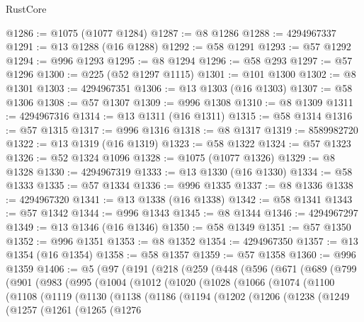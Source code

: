 \begin{lexlean}{RustCore}
\begin{coremodule}
@1286 := @1075 (@1077 @1284)
@1287 := @8 @1286
@1288 := 4294967337
@1291 := @13 @1288 (@16 @1288)
@1292 := @58 @1291
@1293 := @57 @1292
@1294 := @996 @1293
@1295 := @8 @1294
@1296 := @58 @293
@1297 := @57 @1296
@1300 := @225 (@52 @1297 @1115)
@1301 := @101 @1300
@1302 := @8 @1301
@1303 := 4294967351
@1306 := @13 @1303 (@16 @1303)
@1307 := @58 @1306
@1308 := @57 @1307
@1309 := @996 @1308
@1310 := @8 @1309
@1311 := 4294967316
@1314 := @13 @1311 (@16 @1311)
@1315 := @58 @1314
@1316 := @57 @1315
@1317 := @996 @1316
@1318 := @8 @1317
@1319 := 8589982720
@1322 := @13 @1319 (@16 @1319)
@1323 := @58 @1322
@1324 := @57 @1323
@1326 := @52 @1324 @1096
@1328 := @1075 (@1077 @1326)
@1329 := @8 @1328
@1330 := 4294967319
@1333 := @13 @1330 (@16 @1330)
@1334 := @58 @1333
@1335 := @57 @1334
@1336 := @996 @1335
@1337 := @8 @1336
@1338 := 4294967320
@1341 := @13 @1338 (@16 @1338)
@1342 := @58 @1341
@1343 := @57 @1342
@1344 := @996 @1343
@1345 := @8 @1344
@1346 := 4294967297
@1349 := @13 @1346 (@16 @1346)
@1350 := @58 @1349
@1351 := @57 @1350
@1352 := @996 @1351
@1353 := @8 @1352
@1354 := 4294967350
@1357 := @13 @1354 (@16 @1354)
@1358 := @58 @1357
@1359 := @57 @1358
@1360 := @996 @1359
@1406 := @5
    (@97
      (@191
        (@218
          (@259
            (@448
              (@596
                (@671
                  (@689
                    (@799
                      (@901
                        (@983
                          (@995
                            (@1004
                              (@1012
                                (@1020
                                  (@1028
                                    (@1066
                                      (@1074
                                        (@1100
                                          (@1108
                                            (@1119
                                              (@1130
                                                (@1138
                                                  (@1186
                                                    (@1194
                                                      (@1202
                                                        (@1206
                                                          (@1238
                                                            (@1249
                                                              (@1257
                                                                (@1261
                                                                  (@1265
                                                                    (@1276

\end{coremodule}
\end{lexlean}
